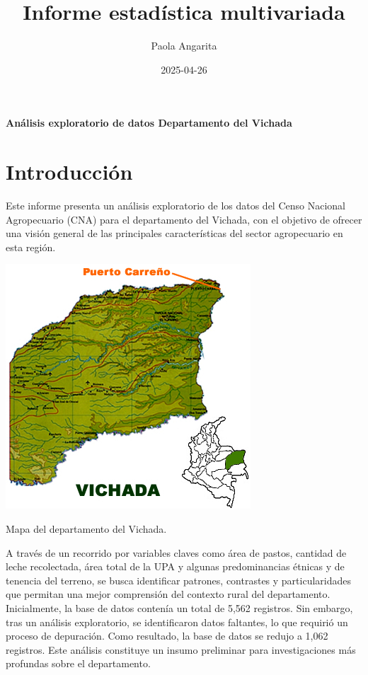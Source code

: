 \documentclass[]{tufte-handout}
\title[R Markdown]{Informe estadística multivariada}
\author{Paola Angarita}
\date{2025-04-26}
\begin{document}
\maketitle




\begin{center}
\LARGE\textbf{Análisis exploratorio de datos Departamento del Vichada}
\end{center}

\section{Introducción}\label{introducciuxf3n}

\begin{justify}
Este informe presenta un análisis exploratorio de los datos del Censo Nacional Agropecuario (CNA) para el departamento del Vichada, con el objetivo de ofrecer una visión general de las principales características del sector agropecuario en esta región. 

\begin{marginfigure}
\includegraphics[width=0.8\linewidth]{mapa_vichada} \caption[Mapa del departamento del Vichada]{Mapa del departamento del Vichada.}\label{fig:mapa-vichada}
\end{marginfigure}
A través de un recorrido por variables claves como   área de pastos, cantidad de leche recolectada, área total de la UPA y algunas predominancias étnicas y de tenencia del terreno, se busca identificar patrones, contrastes y particularidades que permitan una mejor comprensión del contexto rural del departamento. Inicialmente, la base de datos contenía un total de 5,562 registros. Sin embargo, tras un análisis exploratorio, se identificaron datos faltantes, lo que requirió un proceso de depuración. Como resultado, la base de datos se redujo a 1,062 registros. Este análisis constituye un insumo preliminar para investigaciones más profundas sobre el departamento.

\end{justify}
\end{document}
